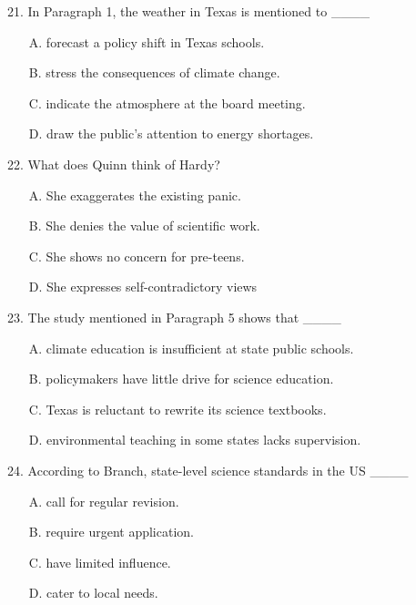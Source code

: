 \documentclass[UTF8,11pt]{ctexart}
\begin{document}
21. In Paragraph 1, the weather in Texas is mentioned to \_\_\_\_


\begin{itemize}[leftmargin=2em,itemsep=.2em,topsep=.4em]\item[A.] forecast a policy shift in Texas schools.
\item[B.] stress the consequences of climate change.
\item[C.] indicate the atmosphere at the board meeting.
\item[D.] draw the public’s attention to energy shortages.
\end{itemize}

22. What does Quinn think of Hardy?


\begin{itemize}[leftmargin=2em,itemsep=.2em,topsep=.4em]\item[A.] She exaggerates the existing panic.
\item[B.] She denies the value of scientific work.
\item[C.] She shows no concern for pre-teens.
\item[D.] She expresses self-contradictory views
\end{itemize}

23. The study mentioned in Paragraph 5 shows that \_\_\_\_


\begin{itemize}[leftmargin=2em,itemsep=.2em,topsep=.4em]\item[A.] climate education is insufficient at state public schools.
\item[B.] policymakers have little drive for science education.
\item[C.] Texas is reluctant to rewrite its science textbooks.
\item[D.] environmental teaching in some states lacks supervision.
\end{itemize}

24. According to Branch, state-level science standards in the US \_\_\_\_


\begin{itemize}[leftmargin=2em,itemsep=.2em,topsep=.4em]\item[A.] call for regular revision.
\item[B.] require urgent application.
\item[C.] have limited influence.
\item[D.] cater to local needs.
\end{itemize}
\end{document}
